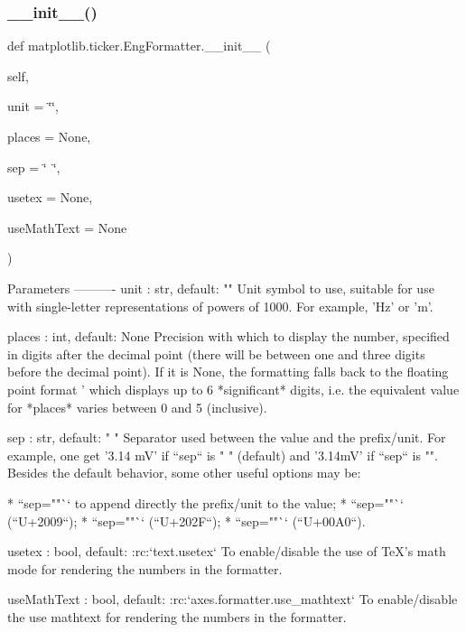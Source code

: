 \subsubsection{\texorpdfstring{\+\_\+\+\_\+init\+\_\+\+\_\+()}{\_\_init\_\_()}}
{\footnotesize\ttfamily def matplotlib.\+ticker.\+Eng\+Formatter.\+\_\+\+\_\+init\+\_\+\+\_\+ (\begin{DoxyParamCaption}\item[{}]{self,  }\item[{}]{unit = {\ttfamily \char`\"{}\char`\"{}},  }\item[{}]{places = {\ttfamily None},  }\item[{}]{sep = {\ttfamily \char`\"{}~\char`\"{}},  }\item[{}]{usetex = {\ttfamily None},  }\item[{}]{use\+Math\+Text = {\ttfamily None} }\end{DoxyParamCaption})}

\begin{DoxyVerb}Parameters
----------
unit : str, default: ""
    Unit symbol to use, suitable for use with single-letter
    representations of powers of 1000. For example, 'Hz' or 'm'.

places : int, default: None
    Precision with which to display the number, specified in
    digits after the decimal point (there will be between one
    and three digits before the decimal point). If it is None,
    the formatting falls back to the floating point format '%
    which displays up to 6 *significant* digits, i.e. the equivalent
    value for *places* varies between 0 and 5 (inclusive).

sep : str, default: " "
    Separator used between the value and the prefix/unit. For
    example, one get '3.14 mV' if ``sep`` is " " (default) and
    '3.14mV' if ``sep`` is "". Besides the default behavior, some
    other useful options may be:

    * ``sep=""`` to append directly the prefix/unit to the value;
    * ``sep=""`` (``U+2009``);
    * ``sep=""`` (``U+202F``);
    * ``sep=""`` (``U+00A0``).

usetex : bool, default: :rc:`text.usetex`
    To enable/disable the use of TeX's math mode for rendering the
    numbers in the formatter.

useMathText : bool, default: :rc:`axes.formatter.use_mathtext`
    To enable/disable the use mathtext for rendering the numbers in
    the formatter.
\end{DoxyVerb}
 

